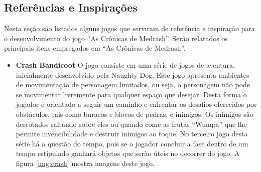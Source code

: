 \subsection{Referências e Inspirações}
Nesta seção são listados alguns jogos que serviram de referência e inspiração 
para o desenvolvimento do jogo ``As Crônicas de Medrash''. Serão relatados os principais 
itens empregados em ``As Crônicas de Medrash''.

\begin{itemize}
\item {\bf Crash Bandicoot\cite{bib:crash_game}}
O jogo consiste 
em uma série de jogos de aventura, inicialmente desenvolvido pela Naughty Dog.
Este jogo apresenta ambientes de movimentação de personagem limitados, ou seja, 
o personagem não pode se movimentar livremente para qualquer espaço que desejar.
 Desta forma o jogador é orientado a seguir um caminho e enfrentar os desafios 
oferecidos por obstáculos, tais como buracos e blocos de pedras, e inimigos.
Os inimigos são derrotados saltando sobre eles ou quando come as frutas ``Wumpa'' que lhe 
permite invencibilidade e destruir inimigos ao toque.
No terceiro jogo desta série há a questão do tempo, pois se o jogador concluir a fase
 dentro de um tempo estipulado ganhará objetos que serão úteis no decorrer do jogo. A figura \ref{img:crash} mostra imagens deste jogo.


\end{itemize}
